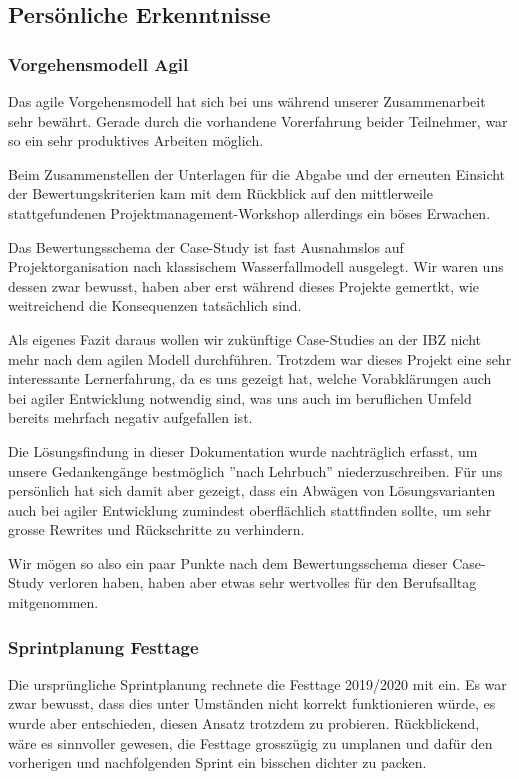 \subsection{Persönliche Erkenntnisse}
\subsubsection*{Vorgehensmodell Agil}
Das agile Vorgehensmodell hat sich bei uns während unserer Zusammenarbeit sehr bewährt. Gerade durch die vorhandene Vorerfahrung beider Teilnehmer, war so ein sehr produktives Arbeiten möglich.

Beim Zusammenstellen der Unterlagen für die Abgabe und der erneuten Einsicht der Bewertungskriterien kam mit dem Rückblick auf den mittlerweile stattgefundenen Projektmanagement-Workshop allerdings ein böses Erwachen.

Das Bewertungsschema der Case-Study ist fast Ausnahmslos auf Projektorganisation nach klassischem Wasserfallmodell ausgelegt. Wir waren uns dessen zwar bewusst, haben aber erst während dieses Projekte gemertkt, wie weitreichend die Konsequenzen tatsächlich sind.

Als eigenes Fazit daraus wollen wir zukünftige Case-Studies an der IBZ nicht mehr nach dem agilen Modell durchführen. Trotzdem war dieses Projekt eine sehr interessante Lernerfahrung, da es uns gezeigt hat, welche Vorabklärungen auch bei agiler Entwicklung notwendig sind, was uns auch im beruflichen Umfeld bereits mehrfach negativ aufgefallen ist.

Die Lösungsfindung in dieser Dokumentation wurde nachträglich erfasst, um unsere Gedankengänge bestmöglich ''nach Lehrbuch'' niederzuschreiben. Für uns persönlich hat sich damit aber gezeigt, dass ein Abwägen von Lösungsvarianten auch bei agiler Entwicklung zumindest oberflächlich stattfinden sollte, um sehr grosse Rewrites und Rückschritte zu verhindern.

Wir mögen so also ein paar Punkte nach dem Bewertungsschema dieser Case-Study verloren haben, haben aber etwas sehr wertvolles für den Berufsalltag mitgenommen.

\subsubsection*{Sprintplanung Festtage}
Die ursprüngliche Sprintplanung rechnete die Festtage 2019/2020 mit ein.
Es war zwar bewusst, dass dies unter Umständen nicht korrekt funktionieren würde, es wurde aber entschieden, diesen Ansatz trotzdem zu probieren.
Rückblickend, wäre es sinnvoller gewesen, die Festtage grosszügig zu umplanen und dafür den vorherigen und nachfolgenden Sprint ein bisschen dichter zu packen.

